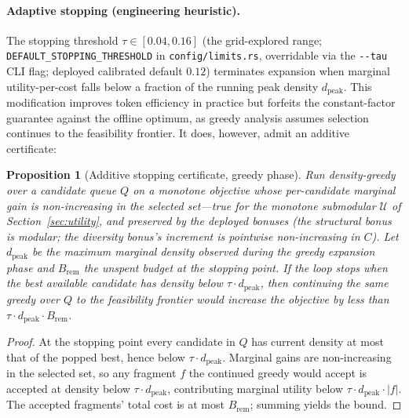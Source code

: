 \documentclass[11pt, a4paper]{article}
\newtheorem{proposition}{Proposition}
\begin{document}
\paragraph{Adaptive stopping (engineering heuristic).} The stopping threshold $\tau \in [0.04, 0.16]$ (the grid-explored range; \texttt{DEFAULT\_STOPPING\_THRESHOLD} in \texttt{config/limits.rs}, overridable via the \texttt{-{}-tau} CLI flag; deployed calibrated default $0.12$) terminates expansion when marginal utility-per-cost falls below a fraction of the running peak density $d_{\mathrm{peak}}$. This modification improves token efficiency in practice but forfeits the constant-factor guarantee against the offline optimum, as greedy analysis assumes selection continues to the feasibility frontier. It does, however, admit an additive certificate:

\begin{proposition}[Additive stopping certificate, greedy phase]
\label{prop:stopping}
Run density-greedy over a candidate queue $Q$ on a monotone objective whose per-candidate marginal gain is non-increasing in the selected set---true for the monotone submodular $\mathcal{U}$ of Section~\ref{sec:utility}, and preserved by the deployed bonuses (the structural bonus is modular; the diversity bonus's increment is pointwise non-increasing in $C$). Let $d_{\mathrm{peak}}$ be the maximum marginal density observed during the greedy expansion phase and $B_{\mathrm{rem}}$ the unspent budget at the stopping point. If the loop stops when the best available candidate has density below $\tau \cdot d_{\mathrm{peak}}$, then continuing the same greedy over $Q$ to the feasibility frontier would increase the objective by less than $\tau \cdot d_{\mathrm{peak}} \cdot B_{\mathrm{rem}}$.
\end{proposition}
\begin{proof}
At the stopping point every candidate in $Q$ has current density at most that of the popped best, hence below $\tau \cdot d_{\mathrm{peak}}$. Marginal gains are non-increasing in the selected set, so any fragment $f$ the continued greedy would accept is accepted at density below $\tau \cdot d_{\mathrm{peak}}$, contributing marginal utility below $\tau \cdot d_{\mathrm{peak}} \cdot |f|$. The accepted fragments' total cost is at most $B_{\mathrm{rem}}$; summing yields the bound.
\end{proof}
\end{document}
